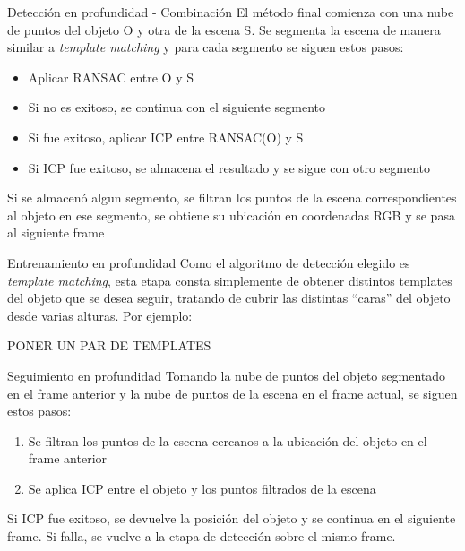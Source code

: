 \documentclass[]{beamer}
\begin{document}
\begin{frame}[t]{Detección en profundidad - Combinación}
    El método final comienza con una nube de puntos del objeto O y otra de la escena S. Se segmenta la escena de manera similar a \textit{template matching} y para cada segmento se siguen estos pasos:
    \begin{itemize}
        \item Aplicar RANSAC entre O y S
        \item Si no es exitoso, se continua con el siguiente segmento
        \item Si fue exitoso, aplicar ICP entre RANSAC(O) y S
        \item Si ICP fue exitoso, se almacena el resultado y se sigue con otro segmento
    \end{itemize}
    Si se almacenó algun segmento, se filtran los puntos de la escena correspondientes al objeto en ese segmento, se obtiene su ubicación en coordenadas RGB y se pasa al siguiente frame
\end{frame}


\begin{frame}[t]{Entrenamiento en profundidad}
    Como el algoritmo de detección elegido es \textit{template matching}, esta etapa consta simplemente de obtener distintos templates del objeto que se desea seguir, tratando de cubrir las distintas ``caras'' del objeto desde varias alturas. Por ejemplo:
    \begin{block}{}
        PONER UN PAR DE TEMPLATES
    \end{block}
\end{frame}


\begin{frame}[t]{Seguimiento en profundidad}
    Tomando la nube de puntos del objeto segmentado en el frame anterior y la nube de puntos de la escena en el frame actual, se siguen estos pasos:
    \begin{enumerate}
        \item Se filtran los puntos de la escena cercanos a la ubicación del objeto en el frame anterior
        \item Se aplica ICP entre el objeto y los puntos filtrados de la escena
    \end{enumerate}
    Si ICP fue exitoso, se devuelve la posición del objeto y se continua en el siguiente frame. Si falla, se vuelve a la etapa de detección sobre el mismo frame.
\end{frame}
\end{document}
